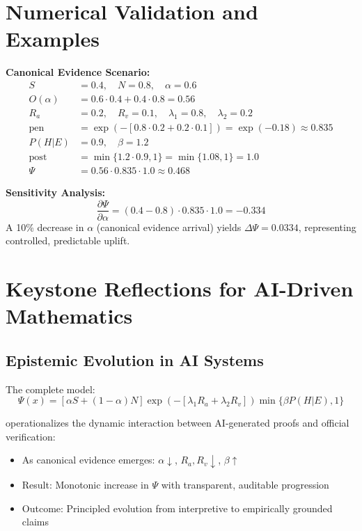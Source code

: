 \documentclass[12pt,a4paper]{article}
\theoremstyle{definition}
\theoremstyle{remark}
\begin{document}
\section{Numerical Validation and Examples}

\begin{examplebox}
\textbf{Canonical Evidence Scenario:}
\begin{align}
S &= 0.4, \quad N = 0.8, \quad \alpha = 0.6 \\
O(\alpha) &= 0.6 \cdot 0.4 + 0.4 \cdot 0.8 = 0.56 \\
R_a &= 0.2, \quad R_v = 0.1, \quad \lambda_1 = 0.8, \quad \lambda_2 = 0.2 \\
\text{pen} &= \exp(-[0.8 \cdot 0.2 + 0.2 \cdot 0.1]) = \exp(-0.18) \approx 0.835 \\
P(H|E) &= 0.9, \quad \beta = 1.2 \\
\text{post} &= \min\{1.2 \cdot 0.9, 1\} = \min\{1.08, 1\} = 1.0 \\
\Psi &= 0.56 \cdot 0.835 \cdot 1.0 \approx 0.468
\end{align}

\textbf{Sensitivity Analysis:}
$$\frac{\partial \Psi}{\partial \alpha} = (0.4 - 0.8) \cdot 0.835 \cdot 1.0 = -0.334$$
A 10\% decrease in $\alpha$ (canonical evidence arrival) yields $\Delta\Psi = 0.0334$, representing controlled, predictable uplift.
\end{examplebox}

\section{Keystone Reflections for AI-Driven Mathematics}

\subsection{Epistemic Evolution in AI Systems}

The complete model:
$$\Psi(x) = [\alpha S + (1-\alpha) N] \exp(-[\lambda_1 R_a + \lambda_2 R_v]) \min\{\beta P(H|E), 1\}$$

operationalizes the dynamic interaction between AI-generated proofs and official verification:

\begin{itemize}
    \item As canonical evidence emerges: $\alpha \downarrow$, $R_a, R_v \downarrow$, $\beta \uparrow$
    \item Result: Monotonic increase in $\Psi$ with transparent, auditable progression
    \item Outcome: Principled evolution from interpretive to empirically grounded claims
\end{itemize}
\end{document}
